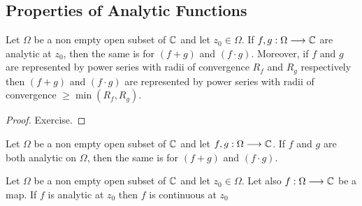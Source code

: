   \subsection{Properties of Analytic Functions}
  \begin{proposition}[]
  Let $\Omega  $ be a non empty open subset of $\mathbb{C}  $ and let $z_0 \in   \Omega  $. If 
  $ f,g : \Omega  \longrightarrow \mathbb{C}  $ are analytic at $z_0 $, then the same is for $(f+g)  $ and 
  $(f \cdot g)  $. Moreover, if $f  $ and $g $ are represented by power series with radii of convergence $R_{f} $ and
  $R_{g} $ respectively then $(f+g)  $ and $(f \cdot  g)  $ are represented by power series 
  with radii of convergence $ \geq \min (R_{f}, R_{g})  $. 
  \end{proposition}
  \begin{proof}
  Exercise.
  \end{proof}
  \begin{corollary}[]
    Let $ \Omega  $ be a non empty open subset of $\mathbb{C}  $ and let $ f,g : \Omega  \longrightarrow \mathbb{C} $. If $f $ 
    and $g $ are both analytic on $\Omega  $, then the same is for $(f + g)  $ 
    and $(f \cdot g)$. 
  \end{corollary}
  \begin{proposition}
    Let $\Omega  $ be a non empty open subset of $\mathbb{C}  $ and let $z_0 \in  \Omega  $.
    Let also $ f : \Omega  \longrightarrow \mathbb{C}  $ be a map. 
    If $f $ is analytic at $z_0 $ then $f $ is continuous at $z_0 $ 
  \end{proposition}
